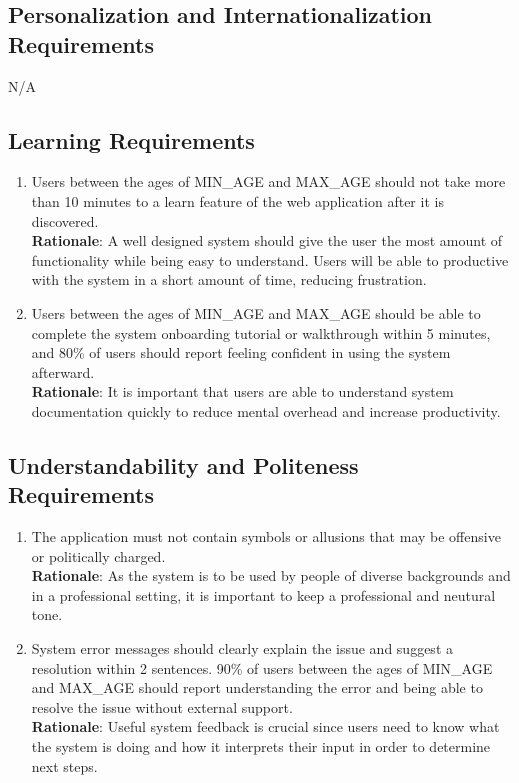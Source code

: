 \documentclass[12pt]{article}
\begin{document}
\subsection{Personalization and Internationalization Requirements}
N/A
\subsection{Learning Requirements}
\begin{enumerate}[{UH-LR}1.]
  \item Users between the ages of {MIN\_AGE} and {MAX\_AGE} should not take
    more than 10 minutes to a learn feature of the web application after it is
    discovered.\\
    \textbf{Rationale}: A well designed system should give the user
    the most amount of functionality while being easy to understand.
    Users will be able to productive with the system in a short
    amount of time, reducing frustration.
  \item Users between the ages of {MIN\_AGE} and {MAX\_AGE} should be able to
    complete the system onboarding tutorial or walkthrough within 5 minutes,
    and 80\% of users should report feeling confident in using the
    system afterward.\\
    \textbf{Rationale}: It is important that users are able to understand
    system documentation quickly to reduce mental overhead and increase
    productivity.
\end{enumerate}
\subsection{Understandability and Politeness Requirements}
\begin{enumerate}[{UH-UP}1.]
  \item The application must not contain symbols or allusions that
    may be offensive or politically charged.\\
    \textbf{Rationale}: As the system is to be used by people of
    diverse backgrounds and in a professional setting, it is
    important to keep a professional and neutural tone.
  \item System error messages should clearly explain the issue and
    suggest a resolution within 2 sentences. 90\% of users between
    the ages of {MIN\_AGE} and {MAX\_AGE} should report understanding
    the error and being able to resolve the issue without external support.\\
    \textbf{Rationale}: Useful system feedback is crucial since users need to
    know what the system is doing and how it interprets their input in order to
    determine next steps.
\end{enumerate}
\end{document}
